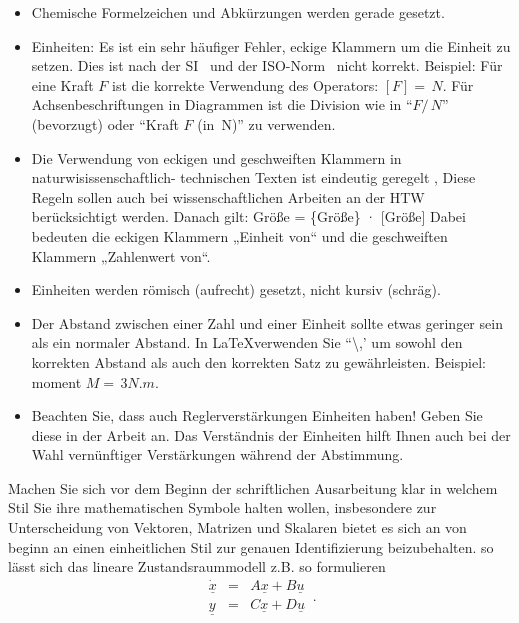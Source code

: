 \begin{itemize}
\item Chemische Formelzeichen und Abkürzungen werden gerade gesetzt.
\item Einheiten: Es ist ein sehr häufiger Fehler, eckige Klammern um die Einheit zu setzen. Dies ist nach der SI~\cite{SIbrochure2006} und der ISO-Norm~\cite{ISOnormunits} nicht korrekt. Beispiel: Für eine Kraft $F$ ist die korrekte Verwendung des Operators: $[F]=\,{N}$. Für Achsenbeschriftungen in Diagrammen ist die Division wie in ``$F/\,{N}$'' (bevorzugt) oder ``Kraft $F$ (in \,{N})'' zu verwenden. %
\item Die Verwendung von eckigen und geschweiften Klammern in naturwisissenschaftlich- technischen  Texten ist eindeutig geregelt \cite{ISOnormunits}\cite{DINFormelsatz}\cite{DINFormelzeichen}, Diese Regeln sollen auch bei wissenschaftlichen Arbeiten an der HTW berücksichtigt werden. Danach gilt:
Größe = \{Größe\} · [Größe]
Dabei bedeuten die eckigen Klammern „Einheit von“ und die geschweiften Klammern
„Zahlenwert von“.

\item Einheiten werden römisch (aufrecht) gesetzt, nicht kursiv (schräg).

\item Der Abstand zwischen einer Zahl und einer Einheit sollte etwas geringer sein als ein normaler Abstand. In \LaTeX verwenden Sie ``\textbackslash,' um sowohl den korrekten Abstand als auch den korrekten Satz zu gewährleisten. 
Beispiel: moment $M=\,{3}{N.m}$.%

\item Beachten Sie, dass auch Reglerverstärkungen Einheiten haben! Geben Sie diese in der Arbeit an. Das Verständnis der Einheiten hilft Ihnen auch bei der Wahl vernünftiger Verstärkungen während der Abstimmung.



\end{itemize}

Machen Sie sich vor dem Beginn der schriftlichen Ausarbeitung klar in welchem Stil Sie ihre mathematischen Symbole halten wollen, insbesondere zur Unterscheidung von Vektoren, Matrizen und Skalaren bietet es sich an von beginn an einen einheitlichen Stil zur genauen Identifizierung beizubehalten. so lässt sich das lineare Zustandsraummodell z.B. so formulieren
\begin{equation}
\begin{array}{rcl}
\underline{\dot{x}} & = & A\underline{x} + B\underline{u}\\
\underline{y} & = & C\underline{x} + D\underline{u}
\end{array}\,.
\label{eq:linear}
\end{equation}


